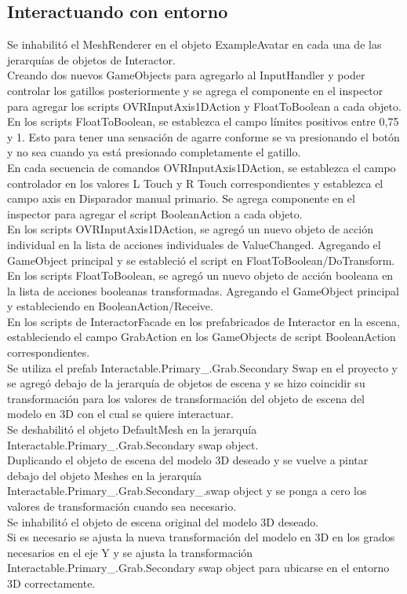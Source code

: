 \subsection{Interactuando con entorno}
Se inhabilitó el MeshRenderer en el objeto ExampleAvatar en cada una de las jerarquías de objetos de Interactor.\\
Creando dos nuevos GameObjects para agregarlo al InputHandler y poder controlar los gatillos posteriormente y se agrega el componente en el inspector para agregar los scripts
OVRInputAxis1DAction y FloatToBoolean a cada objeto.\\
En los scripts FloatToBoolean, se establezca el campo límites positivos entre 0,75 y 1. Esto para tener una sensación de agarre conforme se va presionando el botón y no sea 
cuando ya está presionado completamente el gatillo.\\
En cada secuencia de comandos OVRInputAxis1DAction, se establezca el campo controlador en los valores L Touch y R Touch correspondientes y establezca el campo axis en 
Disparador manual primario. Se agrega componente en el inspector para agregar el script BooleanAction a cada objeto.\\
En los scripts OVRInputAxis1DAction, se agregó un nuevo objeto de acción individual en la lista de acciones individuales de ValueChanged. Agregando el GameObject principal 
y se estableció el script en FloatToBoolean/DoTransform.\\
En los scripts FloatToBoolean, se agregó un nuevo objeto de acción booleana en la lista de acciones booleanas transformadas. Agregando el GameObject principal y estableciendo 
en BooleanAction/Receive.\\
En los scripts de InteractorFacade en los prefabricados de Interactor en la escena, estableciendo el campo GrabAction en los GameObjects de script BooleanAction correspondientes.\\
Se utiliza el prefab Interactable.Primary\_.Grab.Secondary Swap en el proyecto y se agregó debajo de la jerarquía de objetos de escena y se hizo coincidir su transformación para 
los valores de transformación del objeto de escena del modelo en 3D con el cual se quiere interactuar.\\
Se deshabilitó el objeto DefaultMesh en la jerarquía Interactable.Primary\_.Grab.Secondary swap object.\\
Duplicando el objeto de escena del modelo 3D deseado y  se vuelve a pintar debajo del objeto Meshes en la jerarquía Interactable.Primary\_.Grab.Secondary\_.swap object y 
se ponga a cero los valores de transformación cuando sea necesario.\\
Se inhabilitó el objeto de escena original del modelo 3D deseado.\\
Si es necesario se ajusta la nueva transformación del modelo en 3D en los grados necesarios en el eje Y y se ajusta la transformación Interactable.Primary\_.Grab.Secondary 
swap object para ubicarse en el entorno 3D correctamente.\\

